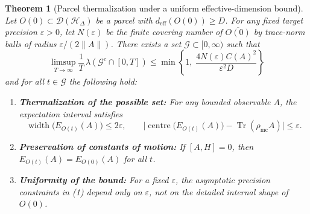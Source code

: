 \documentclass[11pt, onecolumn]{article}
\newtheorem{theorem}{Theorem}
\begin{document}
\begin{theorem}[Parcel thermalization under a uniform effective-dimension bound]
\label{thm:basic}
Let $O(0) \subset \mathcal D(\mathcal H_\Delta)$ be a parcel with \(d_{\mathrm{eff}}(O(0))\ge D\). For any fixed target precision \(\varepsilon>0\), let \(N(\varepsilon)\) be the finite covering number of \(\overline{O(0)}\) by trace-norm balls of radius \(\varepsilon/(2\|A\|)\). There exists a set \(\mathcal{G}\subset[0,\infty)\) such that
\[
\limsup_{T\to\infty}\frac{1}{T}\,\lambda(\mathcal{G}^c\cap[0,T]) \le \min\left\{1,\; \frac{4N(\varepsilon)C(A)^2}{\varepsilon^2 D}\right\}
\]
and for all \(t\in\mathcal{G}\) the following hold:

\begin{enumerate}
    \item \textbf{Thermalization of the possible set:} For any bounded observable \(A\), the expectation interval satisfies
    \[
    \operatorname{width}\bigl(E_{O(t)}(A)\bigr) \le 2\varepsilon, \qquad
    \bigl|\operatorname{centre}\bigl(E_{O(t)}(A)\bigr)-\operatorname{Tr}(\rho_{\mathrm{mc}}A)\bigr| \le \varepsilon.
    \]
    \item \textbf{Preservation of constants of motion:} If \([A,H]=0\), then \(E_{O(t)}(A)=E_{O(0)}(A)\) for all \(t\).
    \item \textbf{Uniformity of the bound:} For a fixed \(\varepsilon\), the asymptotic precision constraints in (1) depend only on \(\varepsilon\), not on the detailed internal shape of \(O(0)\).
\end{enumerate}
\end{theorem}
\end{document}
